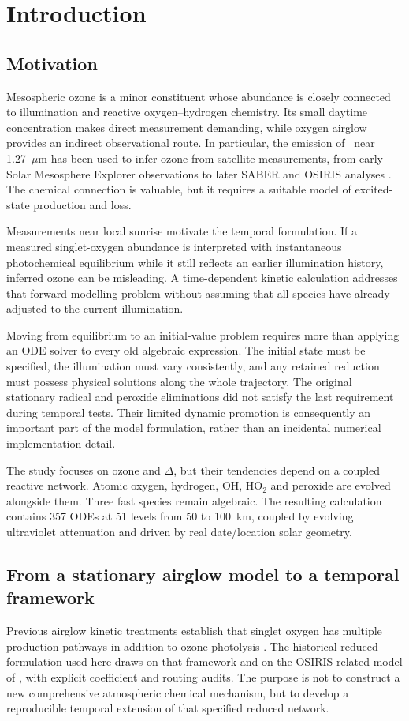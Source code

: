 \chapter{Introduction}\label{ch:introduction}
\section{Motivation}
Mesospheric ozone is a minor constituent whose abundance is closely connected to illumination and reactive oxygen--hydrogen chemistry. Its small daytime concentration makes direct measurement demanding, while oxygen airglow provides an indirect observational route. In particular, the emission of \singlet\ near 1.27~$\mu$m has been used to infer ozone from satellite measurements, from early Solar Mesosphere Explorer observations to later SABER and OSIRIS analyses \citep{thomas1983,mlynczak2007,li2020}. The chemical connection is valuable, but it requires a suitable model of excited-state production and loss.

Measurements near local sunrise motivate the temporal formulation. If a measured singlet-oxygen abundance is interpreted with instantaneous photochemical equilibrium while it still reflects an earlier illumination history, inferred ozone can be misleading. A time-dependent kinetic calculation addresses that forward-modelling problem without assuming that all species have already adjusted to the current illumination.

Moving from equilibrium to an initial-value problem requires more than applying an ODE solver to every old algebraic expression. The initial state must be specified, the illumination must vary consistently, and any retained reduction must possess physical solutions along the whole trajectory. The original stationary radical and peroxide eliminations did not satisfy the last requirement during temporal tests. Their limited dynamic promotion is consequently an important part of the model formulation, rather than an incidental numerical implementation detail.

The study focuses on ozone and $\Delta$, but their tendencies depend on a coupled reactive network. Atomic oxygen, hydrogen, OH, HO$_2$ and peroxide are evolved alongside them. Three fast species remain algebraic. The resulting calculation contains 357 ODEs at 51 levels from 50 to 100~km, coupled by evolving ultraviolet attenuation and driven by real date/location solar geometry.

\section{From a stationary airglow model to a temporal framework}
Previous airglow kinetic treatments establish that singlet oxygen has multiple production pathways in addition to ozone photolysis \citep{mlynczak1993}. The historical reduced formulation used here draws on that framework and on the OSIRIS-related model of \citet{li2020}, with explicit coefficient and routing audits. The purpose is not to construct a new comprehensive atmospheric chemical mechanism, but to develop a reproducible temporal extension of that specified reduced network.

